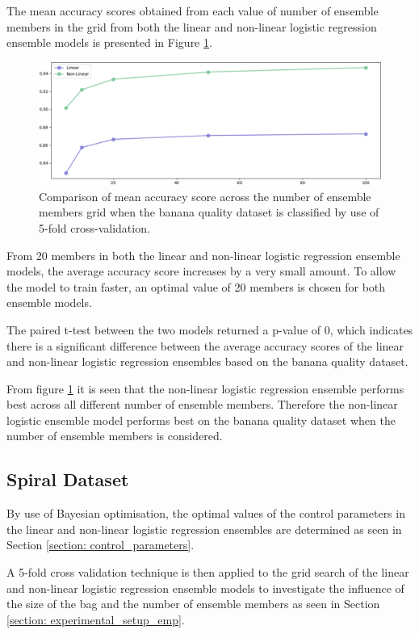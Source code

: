 \documentclass[10pt, conference]{IEEEtran}
\begin{document}
The mean accuracy scores obtained from each value of number of ensemble members in the grid from both the linear and non-linear
logistic regression ensemble models is presented in Figure \ref{fig:BQ_member_comparison}.
\begin{figure}[H]
    \centerline{\includegraphics[scale=0.26]{../Images/BQ_members.PNG}}
    \caption{Comparison of mean accuracy score across the number of ensemble members grid when the banana quality dataset is classified by use of 5-fold cross-validation.}
    \label{fig:BQ_member_comparison}
\end{figure}
From 20 members in both the linear and non-linear logistic regression ensemble models, the average accuracy score
increases by a very small amount. To allow the model to train faster, an optimal value of 20 members is chosen for
both ensemble models.

The paired t-test between the two models returned a p-value of 0, which indicates there is a significant difference
between the average accuracy scores of the linear and non-linear logistic regression ensembles based on the banana quality dataset.

From figure \ref{fig:BQ_member_comparison} it is seen that the non-linear logistic regression ensemble performs best across
all different number of ensemble members. Therefore the non-linear logistic ensemble model performs best on the banana quality dataset when the
number of ensemble members is considered.

\subsection{Spiral Dataset}

By use of Bayesian optimisation, the optimal values of the control parameters in the
linear and non-linear logistic regression ensembles are determined as seen in
Section \ref{section: control_parameters}.

A 5-fold cross validation technique is then applied to the grid search of the linear and non-linear logistic regression ensemble models
to investigate the influence of the size of the bag and the number of ensemble members as seen in Section \ref{section: experimental_setup_emp}.
\end{document}
